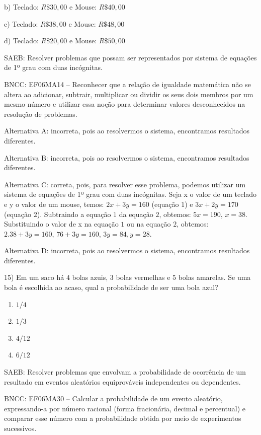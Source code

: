 b) Teclado: $R\$30,00$ e Mouse: $R\$40,00$

c) Teclado: $R\$38,00$ e Mouse: $R\$48,00$

d) Teclado: $R\$20,00$ e Mouse: $R\$50,00$

SAEB: Resolver problemas que possam ser representados por sistema de
equações de 1º grau com duas incógnitas.

BNCC: EF06MA14 -- Reconhecer que a relação de igualdade matemática não
se altera ao adicionar, subtrair, multiplicar ou dividir os seus dois
membros por um mesmo número e utilizar essa noção para determinar
valores desconhecidos na resolução de problemas.

Alternativa A: incorreta, pois ao resolvermos o sistema, encontramos
resultados diferentes.

Alternativa B: incorreta, pois ao resolvermos o sistema, encontramos
resultados diferentes.

Alternativa C: correta, pois, para resolver esse problema, podemos
utilizar um sistema de equações de 1º grau com duas incógnitas. Seja x o
valor de um teclado e y o valor de um mouse, temos: 
$2x + 3y = 160$
(equação $1$) e 
$3x + 2y = 170$ (equação $2$). 
Subtraindo a equação $1$ da
equação $2$, obtemos:
$5x = 190$, 
$x = 38$. Substituindo o valor de x na
equação $1$ ou na equação $2$, obtemos: 
$2.38 + 3y = 160$, 
$76 + 3y = 160$, 
$3y = 84, y = 28$.

Alternativa D: incorreta, pois ao resolvermos o sistema, encontramos
resultados diferentes.

15) Em um saco há $4$ bolas azuis, $3$ bolas vermelhas e $5$ bolas amarelas.
Se uma bola é escolhida ao acaso, qual a probabilidade de ser uma bola
azul?

\begin{enumerate}
\def\labelenumi{\alph{enumi})}
\tightlist
\item
  $1/4$
\item
  $1/3$
\item
  $4/12$
\item
  $6/12$
\end{enumerate}

SAEB: Resolver problemas que envolvam a probabilidade de ocorrência de
um resultado em eventos aleatórios equiprováveis independentes ou
dependentes.

BNCC: EF06MA30 -- Calcular a probabilidade de um evento aleatório,
expressando-a por número racional (forma fracionária, decimal e
percentual) e comparar esse número com a probabilidade obtida por meio
de experimentos sucessivos.

